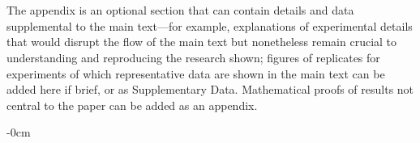 \documentclass[preprints,article,accept,pdftex,moreauthors]{Definitions/mdpi}
\begin{document}
\section[\appendixname~\thesection]{}
\subsection[\appendixname~\thesubsection]{}
The appendix is an optional section that can contain details and data supplemental to the main text---for example, explanations of experimental details that would disrupt the flow of the main text but nonetheless remain crucial to understanding and reproducing the research shown; figures of replicates for experiments of which representative data are shown in the main text can be added here if brief, or as Supplementary Data. Mathematical proofs of results not central to the paper can be added as an appendix.



\begin{adjustwidth}{-\extralength}{0cm}





\PublishersNote{}
\end{adjustwidth}
\end{document}

